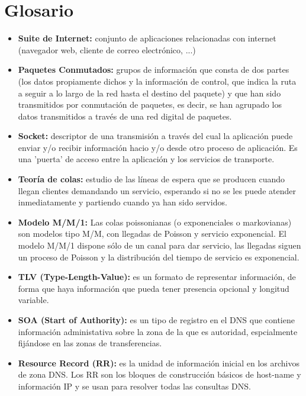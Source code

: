 \documentclass[a4paper,11pt]{article}
\begin{document}
\section{Glosario}
\begin{itemize}
\item \textbf{Suite de Internet:} conjunto de aplicaciones relacionadas con internet (navegador web, cliente de correo electrónico, ...)

\item \textbf{Paquetes Conmutados:} grupos de información que consta de dos partes (los datos propiamente dichos y la información de control, que indica la ruta a seguir a lo largo de la red hasta el destino del paquete) y que han sido transmitidos por conmutación de paquetes, es decir, se han agrupado los datos transmitidos a través de una red digital de paquetes. 

\item \textbf{Socket:} descriptor de una transmisión a través del cual la aplicación puede enviar y/o recibir información hacio y/o desde otro proceso de aplicación. Es una 'puerta' de acceso entre la aplicación y los servicios de transporte.

\item \textbf{Teoría de colas:} estudio de las líneas de espera que se producen cuando llegan clientes demandando un servicio, esperando si no se les puede atender inmediatamente y partiendo cuando ya han sido servidos.

\item \textbf{Modelo M/M/1:} Las colas poissonianas (o exponenciales o markovianas) son modelos tipo M/M, con llegadas de Poisson y servicio exponencial. El modelo M/M/1 dispone sólo de un canal para dar servicio, las llegadas siguen un proceso de Poisson y la distribución del tiempo de servicio es exponencial.

\item \textbf{TLV (Type-Length-Value):} es un formato de representar información, de forma que haya información que pueda tener presencia opcional y longitud variable.

\item \textbf{SOA (Start of Authority):} es un tipo de registro en el DNS que contiene información administativa sobre la zona de la que es autoridad,  espcialmente fijándose en las zonas de transferencias.

\item \textbf{Resource Record (RR):} es la unidad de información inicial en los archivos de zona DNS. Los RR son los bloques de construcción básicos de host-name y información IP y se usan para resolver todas las consultas DNS.


\end{itemize}
\end{document}

